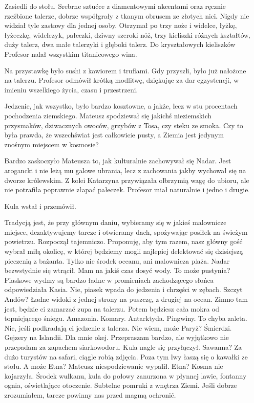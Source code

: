 \divider{}

Zasiedli do stołu. Srebrne sztućce z diamentowymi akcentami oraz ręcznie rzeźbione talerze, dobrze współgrały z tkanym obrusem ze złotych nici.
Nigdy nie widział tyle zastawy dla jednej osoby. 
Otrzymał po trzy noże i widelce, łyżkę, łyżeczkę, widelczyk, pałeczki, dziwny szeroki nóż, trzy kieliszki różnych kształtów, duży talerz, dwa małe talerzyki i głęboki talerz.
Do kryształowych kieliszków Profesor nalał wszystkim titanicowego wina.

Na przystawkę było sushi z kawiorem i truflami. Gdy przyszli, było już nałożone na talerzu. 
Profesor odmówił krótką modlitwę, dziękując za dar egzystencji, w imieniu wszelkiego życia, czasu i przestrzeni.

Jedzenie, jak wszystko, było bardzo kosztowne, a jakże, lecz w stu procentach pochodzenia ziemskiego.
Mateusz spodziewał się jakichś nieziemskich przysmaków, dziwacznych owoców, grzybów z Tosa, czy steku ze smoka.
Czy to była prawda, że wszechświat jest całkowicie pusty, a Ziemia jest jedynym znośnym miejscem w kosmosie?

Bardzo zaskoczyło Mateusza to, jak kulturalnie zachowywał się Nadar. Jest arogancki i nie leżą mu galowe ubrania, lecz z zachowania jakby wychował się na dworze królewskim.
Z kolei Katarzyna przywiązała olbrzymią wagę do ubioru, ale nie potrafiła poprawnie złapać pałeczek.
Profesor miał naturalnie i jedno i drugie.

Kula wstał i przemówił.

\begin{dialogue}
\ds{} Tradycją jest, że przy głównym daniu, wybieramy się w jakieś malownicze miejsce, dezaktywujemy tarcze i otwieramy dach, spożywając posiłek na świeżym powietrzu. \dm{}
Rozpoczął tajemniczo. \dm{} Proponuję, aby tym razem, nasz główny gość wybrał miłą okolicę, w której będziemy mogli najlepiej delektować się dzisiejszą pieczenią z bażanta.
\ds{} Tylko nie środek oceanu, ani malownicza plaża. \dm{} Nadar bezwstydnie się wtrącił. \dm{} Mam na jakiś czas dosyć wody. 
\ds{} To może pustynia? Piaskowe wydmy są bardzo ładne w promieniach zachodzącego słońca \dm{} odpowiedziała Kasia. \de{}
\ds{} Nie, piasek wpada do jedzenia i chrzęści w zębach.
\ds{} Szczyt Andów? Ładne widoki z jednej strony na puszczę, z drugiej na ocean.
\ds{} Zimno tam jest, będzie ci zamarzać zupa na talerzu. Potem będziesz cała mokra od topniejącego śniegu.
\ds{} Amazonia.
\ds{} Komary.
\ds{} Antarktyda.
\ds{} Pingwiny.
\ds{} To chyba zaleta.
\ds{} Nie, jeśli podkradają ci jedzenie z talerza.
\ds{} Nie wiem, może Paryż?
\ds{} Śmierdzi.
\ds{} Gejzery na Islandii.
\ds{} Dla mnie okej.
\ds{} Przepraszam bardzo, ale wyjątkowo nie przepadam za zapachem siarkowodoru. \dm{} Kula nagle się przyłączył.
\ds{} Sawanna?
\ds{} Za dużo turystów na safari, ciągle robią zdjęcia. Poza tym lwy łaszą się o kawałki ze stołu.
\ds{} A może Etna? \dm{} Mateusz niespodziewanie wypalił.
\ds{} Etna? \dm{} Kosma nie kojarzyła.
\ds{} Środek wulkanu, kula do połowy zanurzona w płynnej lawie, fontanny ognia, oświetlające otoczenie. Subtelne pomruki z wnętrza Ziemi.
Jeśli dobrze zrozumiałem, tarcze powinny nas przed magmą ochronić.
\end{dialogue}

